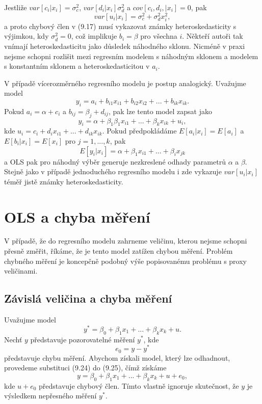 Jestliže $var[c_i|x_i] = \sigma_c^2$, $var[d_i|x_i] \sigma_d^2$ a $cov[c_i, d_i, | x_i] = 0$, pak
\begin{equation}
var[u_i | x_i] = \sigma_c^2 + \sigma_d^2 x_i^2,
\end{equation}
a proto chybový člen v (9.17) musí vykazovat známky heteroskedasticity s výjimkou, kdy $\sigma_d^2 = 0$, což implikuje $b_i = \beta$ pro všechna $i$. Někteří autoři tak vnímají heteroskedasticitu jako důsledek náhodného sklonu. Nicméně v praxi nejsme schopni rozlišit mezi regresním modelem s náhodným sklonem a modelem s konstantním sklonem a heteroskedasticitou v $a_i$.

V případě vícerozměrného regresního modelu je postup analogický. Uvažujme model
\begin{equation}
y_i = a_i + b_{i1} x_{i1} + b_{i2} x_{i2} + ... + b_{ik}x_{ik}.
\end{equation}
Pokud $a_i = \alpha + c_i$ a $b_{ij} = \beta_j + d_{ij}$, pak lze tento model zapsat jako
\begin{equation}
y_i = \alpha + \beta_1 \beta_1 x_{i1} + ... + \beta_k x_{ik} + u_i,
\end{equation}
kde $u_i = c_i + d_i x_{i1} + ... + d_{ik}x_{ik}$. Pokud předpokládáme $E[a_i|x_i] = E[a_i]$ a $E[b_i|x_i] = E[x_i]$ pro $j = 1, ..., k$, pak
\begin{equation}
E[y_i|x_i] = \alpha + \beta_1 x_{i1} + ... + \beta_i x_{jk}
\end{equation}
a OLS pak pro náhodný výběr generuje nezkreslené odhady parametrů $\alpha$ a $\beta$. Stejně jako v případě jednoduchého regresního modelu i zde vykazuje $var[u_i | x_i]$ téměř jistě známky heteroskedasticity.

\section{OLS a chyba měření}

V případě, že do regresního modelu zahrneme veličinu, kterou nejsme schopni přesně změřit, říkáme, že je tento model zatížen chybou měření. Problém chybného měření je koncepčně podobný výše popisovanému problému s proxy veličinami.

\subsection{Závislá veličina a chyba měření}

Uvažujme model
\begin{equation}
y^* = \beta_0 + \beta_1 x_1 + ... + \beta_k x_k + u.
\end{equation}
Nechť $y$ představuje pozorovatelné měření $y^*$, kde
\begin{equation}
e_0 = y - y^*
\end{equation}
představuje chybu měření. Abychom získali model, který lze odhadnout, provedeme substituci (9.24) do (9.25), čímž získáme
\begin{equation}
y = \beta_0 + \beta_1 x_1 + ... + \beta_k x_k + u + e_0,
\end{equation}
kde $u + e_0$ představuje chybový člen. Tímto vlastně ignoruje skutečnost, že $y$ je výsledkem nepřesného měření $y^*$.

